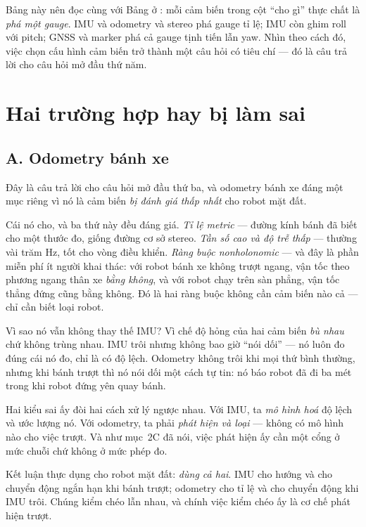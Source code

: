 \documentclass[../../vslam.tex]{subfiles}
\begin{document}
Bảng này nên đọc cùng với Bảng ở : mỗi cảm biến trong cột ``cho gì'' thực chất là \emph{phá một gauge}. IMU và odometry và stereo phá gauge tỉ lệ; IMU còn ghim roll với pitch; GNSS và marker phá cả gauge tịnh tiến lẫn yaw. Nhìn theo cách đó, việc chọn cấu hình cảm biến trở thành một câu hỏi có tiêu chí --- đó là câu trả lời cho câu hỏi mở đầu thứ năm.

\section{Hai trường hợp hay bị làm sai}

\subsection{A. Odometry bánh xe}

Đây là câu trả lời cho câu hỏi mở đầu thứ ba, và odometry bánh xe đáng một mục riêng vì nó là cảm biến \emph{bị đánh giá thấp nhất} cho robot mặt đất.

Cái nó cho, và ba thứ này đều đáng giá. \emph{Tỉ lệ metric} --- đường kính bánh đã biết cho một thước đo, giống đường cơ sở stereo. \emph{Tần số cao và độ trễ thấp} --- thường vài trăm Hz, tốt cho vòng điều khiển. \emph{Ràng buộc nonholonomic} --- và đây là phần miễn phí ít người khai thác: với robot bánh xe không trượt ngang, vận tốc theo phương ngang thân xe \emph{bằng không}, và với robot chạy trên sàn phẳng, vận tốc thẳng đứng cũng bằng không. Đó là hai ràng buộc không cần cảm biến nào cả --- chỉ cần biết loại robot.

Vì sao nó vẫn không thay thế IMU? Vì chế độ hỏng của hai cảm biến \emph{bù nhau} chứ không trùng nhau. IMU trôi nhưng không bao giờ ``nói dối'' --- nó luôn đo đúng cái nó đo, chỉ là có độ lệch. Odometry không trôi khi mọi thứ bình thường, nhưng khi bánh trượt thì nó nói dối một cách tự tin: nó báo robot đã đi ba mét trong khi robot đứng yên quay bánh.

Hai kiểu sai ấy đòi hai cách xử lý ngược nhau. Với IMU, ta \emph{mô hình hoá} độ lệch và ước lượng nó. Với odometry, ta phải \emph{phát hiện và loại} --- không có mô hình nào cho việc trượt. Và như mục~2C đã nói, việc phát hiện ấy cần một cổng ở mức chuỗi chứ không ở mức phép đo.

Kết luận thực dụng cho robot mặt đất: \emph{dùng cả hai}. IMU cho hướng và cho chuyển động ngắn hạn khi bánh trượt; odometry cho tỉ lệ và cho chuyển động khi IMU trôi. Chúng kiểm chéo lẫn nhau, và chính việc kiểm chéo ấy là cơ chế phát hiện trượt.
\end{document}
